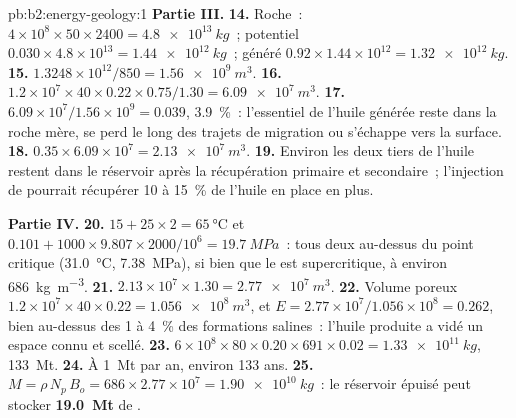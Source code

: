 \begin{solution}{pb:b2:energy-geology:1}
\noindent\textbf{Partie III.}
\textbf{14.} Roche~: $4 \times 10^8 \times 50 \times 2400 = \qty{4.8e13}{kg}$~; potentiel $0.030
\times 4.8 \times 10^{13} = \qty{1.44e12}{kg}$~; généré $0.92 \times 1.44 \times 10^{12} =
\qty{1.32e12}{kg}$.
\textbf{15.} $1.3248 \times 10^{12}/850 = \qty{1.56e9}{m^3}$.
\textbf{16.} $1.2 \times 10^7 \times 40 \times 0.22 \times 0.75/1.30 = \qty{6.09e7}{m^3}$.
\textbf{17.} $6.09 \times 10^7/1.56 \times 10^9 = 0.039$, \qty{3.9}{\percent}~: l'essentiel de l'huile générée
reste dans la roche mère, se perd le long des trajets de migration ou s'échappe vers la surface.
\textbf{18.} $0.35 \times 6.09 \times 10^7 = \qty{2.13e7}{m^3}$.
\textbf{19.} Environ les deux tiers de l'huile restent dans le réservoir après la récupération primaire et secondaire~;
l'injection de  pourrait récupérer 10 à \qty{15}{\percent} de l'huile en place en plus.

\noindent\textbf{Partie IV.}
\textbf{20.} $15 + 25 \times 2 = \qty{65}{\celsius}$ et $0.101 + 1000 \times 9.807 \times 2000/10^6
= \qty{19.7}{MPa}$~: tous deux au-dessus du point critique (\qty{31.0}{\celsius}, \qty{7.38}{MPa}), si bien que le
 est supercritique, à environ \qty{686}{kg.m^{-3}}.
\textbf{21.} $2.13 \times 10^7 \times 1.30 = \qty{2.77e7}{m^3}$.
\textbf{22.} Volume poreux $1.2 \times 10^7 \times 40 \times 0.22 = \qty{1.056e8}{m^3}$, et $E =
2.77 \times 10^7/1.056 \times 10^8 = 0.262$, bien au-dessus des 1 à \qty{4}{\percent} des formations salines~:
l'huile produite a vidé un espace connu et scellé.
\textbf{23.} $6 \times 10^8 \times 80 \times 0.20 \times 691 \times 0.02 = \qty{1.33e11}{kg}$,
\qty{133}{Mt}.
\textbf{24.} À \qty{1}{Mt} par an, environ 133 ans.
\textbf{25.} $M = \rho\,N_p\,B_o = 686 \times 2.77 \times 10^7 = \qty{1.90e10}{kg}$~: le réservoir épuisé peut stocker
\textbf{\qty[text-series-to-math=true]{19.0}{Mt}} de .
\end{solution}
